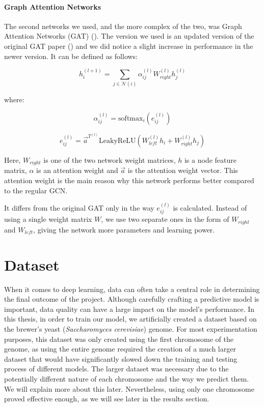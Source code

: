 \documentclass[times, utf8, diplomski, english]{fer_eng}
\begin{document}
\subsubsection{Graph Attention Networks}

The second networks we used, and the more complex of the two, was Graph Attention Networks (GAT) (\cite{GATv2}). The version we used is an updated version of the original GAT paper (\cite{GAT}) and we did notice a slight increase in performance in the newer version. It can be defined as follows:

\[ h_i^{(l+1)} = \sum_{j \in \mathcal{N}(i)} \alpha_{ij}^{(l)} W_{right}^{(l)} h_j^{(l)} \]

where:

\[ \alpha_{ij}^{(l)} = \mathrm{softmax}_i (e_{ij}^{(l)}) \]

\[ e_{ij}^{(l)} = \vec{a}^{T^{(l)}} \mathrm{LeakyReLU} (W_{left}^{(l)} h_i + W_{right}^{(l)} h_j) \]

Here, $W_{right}$ is one of the two network weight matrices, $h$ is a node feature matrix, $\alpha$ is an attention weight and $\vec{a}$ is the attention weight vector. This attention weight is the main reason why this network performs better compared to the regular GCN.

It differs from the original GAT only in the way $e_{ij}^{(l)}$ is calculated. Instead of using a single weight matrix $W$, we use two separate ones in the form of $W_{right}$ and $W_{left}$, giving the network more parameters and learning power.

\chapter{Dataset}

When it comes to deep learning, data can often take a central role in determining the final outcome of the project. Although carefully crafting a predictive model is important, data quality can have a large impact on the model's performance. In this thesis, in order to train our model, we artificially created a dataset based on the brewer's yeast (\textit{Saccharomyces cerevisiae}) genome. For most experimentation purposes, this dataset was only created using the first chromosome of the genome, as using the entire genome required the creation of a much larger dataset that would have significantly slowed down the training and testing process of different models. The larger dataset was necessary due to the potentially different nature of each chromosome and the way we predict them. We will explain more about this later. Nevertheless, using only one chromosome proved effective enough, as we will see later in the results section.
\end{document}
